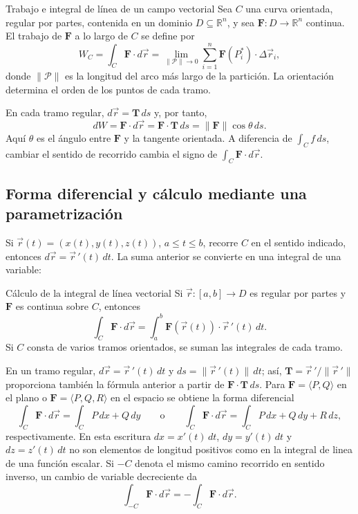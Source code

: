 \begin{mydefinition}{Trabajo e integral de línea de un campo vectorial}
Sea $C$ una curva orientada, regular por partes, contenida en un dominio $D\subseteq\mathbb R^n$, y sea $\mathbf{F}:D\to\mathbb R^n$ continua. El trabajo de $\mathbf{F}$ a lo largo de $C$ se define por
\[
W_C=\int_C\mathbf{F}\cdot d\vec r
=\lim_{\|\mathcal P\|\to0}
\sum_{i=1}^n\mathbf{F}(P_i^*)\cdot\Delta\vec r_i,
\]
donde $\|\mathcal P\|$ es la longitud del arco más largo de la partición. La orientación determina el orden de los puntos de cada tramo.
\end{mydefinition}

En cada tramo regular, $d\vec r=\mathbf{T}\,ds$ y, por tanto,
\[
dW=\mathbf{F}\cdot d\vec r
=\mathbf{F}\cdot\mathbf{T}\,ds
=\|\mathbf{F}\|\cos\theta\,ds.
\]
Aquí $\theta$ es el ángulo entre $\mathbf{F}$ y la tangente orientada. A diferencia de $\int_C f\,ds$, cambiar el sentido de recorrido cambia el signo de $\int_C\mathbf{F}\cdot d\vec r$.

\subsection{Forma diferencial y cálculo mediante una parametrización}

Si $\vec r(t)=(x(t),y(t),z(t))$, $a\leq t\leq b$, recorre $C$ en el sentido indicado, entonces $d\vec r=\vec r\,'(t)\,dt$. La suma anterior se convierte en una integral de una variable:
\begin{mytheorem}{Cálculo de la integral de línea vectorial}
Si $\vec r:[a,b]\to D$ es regular por partes y $\mathbf{F}$ es continua sobre $C$, entonces
\[
\int_C\mathbf{F}\cdot d\vec r
=\int_a^b\mathbf{F}(\vec r(t))\cdot\vec r\,'(t)\,dt.
\]
Si $C$ consta de varios tramos orientados, se suman las integrales de cada tramo.
\end{mytheorem}

En un tramo regular, $d\vec r=\vec r\,'(t)\,dt$ y $ds=\|\vec r\,'(t)\|\,dt$; así, $\mathbf{T}=\vec r\,'/\|\vec r\,'\|$ proporciona también la fórmula anterior a partir de $\mathbf{F}\cdot\mathbf{T}\,ds$. Para $\mathbf{F}=\langle P,Q\rangle$ en el plano o $\mathbf{F}=\langle P,Q,R\rangle$ en el espacio se obtiene la forma diferencial
\[
\int_C\mathbf{F}\cdot d\vec r
=\int_C P\,dx+Q\,dy
\qquad\text{o}\qquad
\int_C\mathbf{F}\cdot d\vec r
=\int_C P\,dx+Q\,dy+R\,dz,
\]
respectivamente. En esta escritura $dx=x'(t)\,dt$, $dy=y'(t)\,dt$ y $dz=z'(t)\,dt$ no son elementos de longitud positivos como en la integral de linea de una función escalar. Si $-C$ denota el mismo camino recorrido en sentido inverso, un cambio de variable decreciente da
\[
\int_{-C}\mathbf{F}\cdot d\vec r=-\int_C\mathbf{F}\cdot d\vec r.
\]

